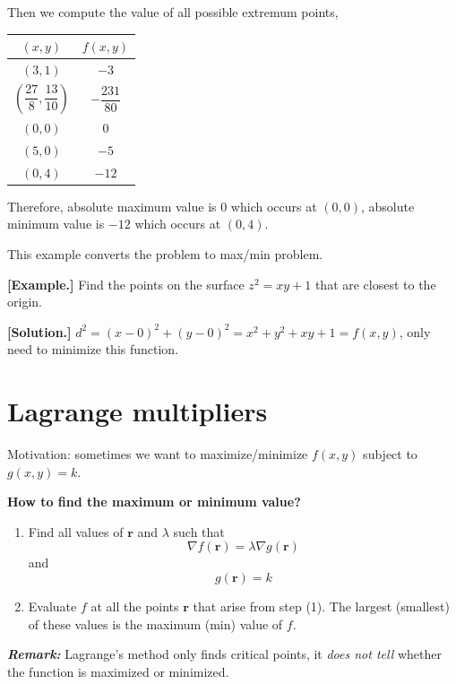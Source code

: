 \documentclass[11pt, a4paper]{MATH2023}
\newcommand{\eg}{\textbf{[Example.] }}
\newcommand{\sol}{\textbf{[Solution.] }}
\begin{document}
\begin{spacing}{1.3}
    Then we compute the value of all possible extremum points,
    \begin{center}
        \begin{tabular}{c|c}\hline\hline
            $(x,y)$ & $f(x,y)$ \\\hline\hline
            $(3,1)$ & $-3$\\\hline
            $\left(\dfrac{27}{8}, \dfrac{13}{10}\right)$ & $-\dfrac{231}{80}$\\\hline
            $(0,0)$ & 0 \\\hline
            $(5,0)$ & $-5$ \\\hline
            $(0,4)$ & $-12$ \\\hline
        \end{tabular}
    \end{center}

    Therefore, absolute maximum value is 0 which occurs at $(0,0)$,
    absolute minimum value is $-12$ which occurs at $(0,4)$. 


    \vspace{0.2in}
    {\blue This example converts the problem to max/min problem.}

    \eg Find the points on the surface $z^2=xy+1$ that are closest to the origin.

    \sol $d^2=(x-0)^2+(y-0)^2=x^2+y^2+xy+1=f(x,y)$, only need to minimize this function.


    \newpage
    \section{Lagrange multipliers}

    {\blue Motivation: sometimes we want to maximize/minimize $f(x,y)$ subject to $g(x,y)=k$.}

    {\bf How to find the maximum or minimum value?}
    \begin{enumerate}
        \item Find all values of $\mathbf{r}$ and $\lambda$ such that
        $$\nabla f(\mathbf{r})=\lambda \nabla g(\mathbf{r})$$
        and $$g(\mathbf{r})=k$$
        \item Evaluate $f$ at all the points $\mathbf{r}$ that arise from step (1). 
        The largest (smallest) of these values is the maximum (min) value of $f$.
    \end{enumerate}

    {\it \textbf{Remark:}} Lagrange's method only finds critical points, 
    it {\it does not tell} whether the function is maximized or minimized.

\end{spacing}
\end{document}
